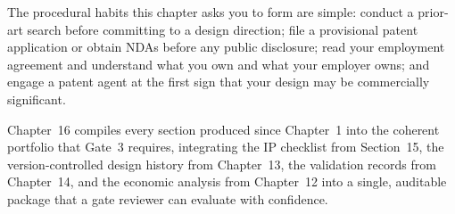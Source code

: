 The procedural habits this chapter asks you to form are simple:
conduct a prior-art search before committing to a design direction;
file a provisional patent application or obtain NDAs before any public disclosure;
read your employment agreement and understand what you own and what your employer
owns; and engage a patent agent at the first sign that your design may be
commercially significant.

Chapter~16 compiles every section produced since Chapter~1 into the coherent
portfolio that Gate~3 requires, integrating the IP checklist from Section~15,
the version-controlled design history from Chapter~13, the validation records
from Chapter~14, and the economic analysis from Chapter~12 into a single,
auditable package that a gate reviewer can evaluate with confidence.
